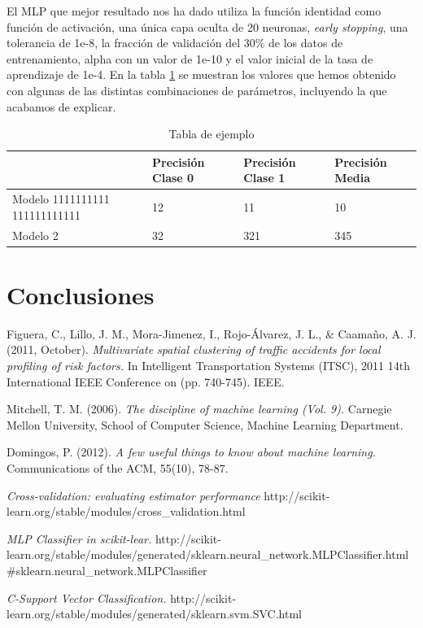 \documentclass[journal,twoside]{JoPhA}
\begin{document}
El MLP que mejor resultado nos ha dado utiliza la función identidad como función de activación, una única capa oculta de 20 neuronas, \textit{early stopping}, una tolerancia de 1e-8, la fracción de validación del 30\% de los datos de entrenamiento, alpha con un valor de 1e-10 y el valor inicial de la tasa de aprendizaje de 1e-4. En la tabla \ref{tabla:tabla_mlp} se muestran los valores que hemos obtenido con algunas de las distintas combinaciones de parámetros, incluyendo la que acabamos de explicar. \\

\begin{table}[htb!]
\begin{center}
	\begin{tabular}{| p{2cm} | p{2cm} | p{2cm} | p{2cm} |}
		\hline
		 & Precisión Clase 0 & Precisión Clase 1 & Precisión Media \\
		 \hline
		 Modelo 1111111111 111111111111 & 12 & 11 & 10 \\
		 \hline
		 Modelo 2 & 32 & 321 & 345 \\
		 \hline
	\end{tabular}
	\caption{Tabla de ejemplo}
	\label{tabla:tabla_mlp}
\end{center}
\end{table}

\section{Conclusiones}

\begin{thebibliography}{1}

Figuera, C., Lillo, J. M., Mora-Jimenez, I., Rojo-Álvarez, J. L., \& Caamaño, A. J. (2011, October). \emph{Multivariate spatial clustering of traffic accidents for local profiling of risk factors.} In Intelligent Transportation Systems (ITSC), 2011 14th International IEEE Conference on (pp. 740-745). IEEE.

Mitchell, T. M. (2006). \emph{The discipline of machine learning (Vol. 9).} Carnegie Mellon University, School of Computer Science, Machine Learning Department.

Domingos, P. (2012). \emph{A few useful things to know about machine learning.} Communications of the ACM, 55(10), 78-87.

\emph{Cross-validation: evaluating estimator performance} http://scikit-learn.org/stable/modules/cross\_validation.html

\emph{MLP Classifier in scikit-lear.}
http://scikit-learn.org/stable/modules/generated/sklearn.neural\_network.MLPClassifier.html\#sklearn.neural\_network.MLPClassifier

\emph{C-Support Vector Classification.}
http://scikit-learn.org/stable/modules/generated/sklearn.svm.SVC.html

\end{thebibliography}
\end{document}
